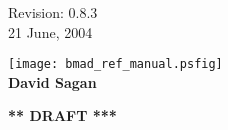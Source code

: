 \thispagestyle{empty}

\begin{flushright}
\large
  Revision: 0.8.3 \\
  21 June, 2004 \\
\end{flushright}

\vfill

{
\begin{center}
\texttt{[image: bmad\_ref\_manual.psfig]} \\
\vskip 0.3in
\huge\bf David Sagan
\end{center}
}

\vskip 1in
\begin{center}
{\Huge \bf *** DRAFT ***}
\end{center}
\vfill
\break
